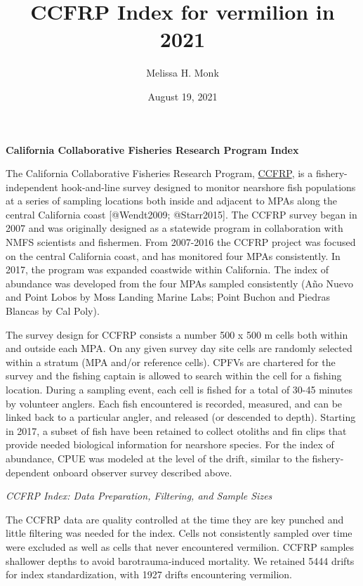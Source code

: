 \documentclass[
]{article}
\title{CCFRP Index for vermilion in 2021}
\author{Melissa H. Monk}
\date{August 19, 2021}
\begin{document}
\maketitle

{
\setcounter{tocdepth}{2}
\tableofcontents
}
\textbf{California Collaborative Fisheries Research Program Index}

The California Collaborative Fisheries Research Program, \href{https://www.mlml.calstate.edu/ccfrp/}{CCFRP},
is a fishery-independent
hook-and-line survey designed to monitor nearshore fish populations at a series of sampling
locations both inside and adjacent to MPAs along the central California coast
{[}@Wendt2009; @Starr2015{]}. The CCFRP survey began in 2007 and was originally
designed as a statewide program in collaboration with NMFS scientists and fishermen.
From 2007-2016 the CCFRP project was focused on the central California coast, and has monitored
four MPAs consistently. In 2017,
the program was expanded coastwide within California. The index of abundance was
developed from the four MPAs sampled consistently (Año Nuevo and Point Lobos
by Moss Landing Marine Labs; Point Buchon and Piedras Blancas by Cal Poly).

The survey design for CCFRP consists a number 500 x 500 m cells both within and
outside each MPA. On any given survey day site cells are randomly
selected within a stratum (MPA and/or reference cells). CPFVs are chartered
for the survey and the fishing captain is allowed to search within the cell for
a fishing location. During a sampling event, each cell is fished for a total of
30-45 minutes by volunteer anglers. Each fish encountered is recorded, measured,
and can be linked back to a particular angler, and released (or descended to depth).
Starting in 2017, a subset of fish have been retained to collect otoliths and fin
clips that provide needed biological information for nearshore species. For the index of abundance, CPUE was modeled at the level of the drift, similar to the
fishery-dependent onboard observer survey described above.

\emph{CCFRP Index: Data Preparation, Filtering, and Sample Sizes}

The CCFRP data are quality controlled at the time they are key punched and little
filtering was needed for the index.
Cells not consistently sampled over time were excluded as well as cells that never encountered vermilion. CCFRP samples shallower
depths to avoid barotrauma-induced mortality. We retained 5444 drifts for index standardization, with 1927 drifts encountering vermilion.
\end{document}
